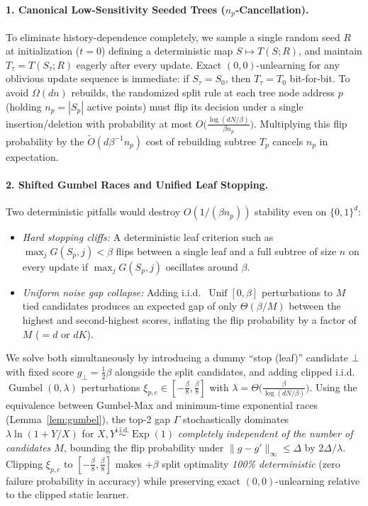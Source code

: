 \documentclass[11pt]{article}
\theoremstyle{definition}
\newcommand{\Unif}{\operatorname{Unif}}
\newcommand{\Gumbel}{\operatorname{Gumbel}}
\newcommand{\Expo}{\operatorname{Exp}}
\begin{document}
\paragraph{1. Canonical Low-Sensitivity Seeded Trees ($n_p$-Cancellation).}
To eliminate history-dependence completely, we sample a single random seed $R$ at initialization ($t = 0$) defining a deterministic map $S \mapsto T(S; R)$, and maintain $T_\tau = T(S_\tau; R)$ eagerly after every update. Exact $(0,0)$-unlearning for any oblivious update sequence is immediate: if $S_\tau = S_0$, then $T_\tau = T_0$ bit-for-bit. To avoid $\Omega(dn)$ rebuilds, the randomized split rule at each tree node address $p$ (holding $n_p = |S_p|$ active points) must flip its decision under a single insertion/deletion with probability at most $O\big(\frac{\log(dN/\beta)}{\beta n_p}\big)$. Multiplying this flip probability by the $\tilde{O}(d\beta^{-1} n_p)$ cost of rebuilding subtree $T_p$ cancels $n_p$ in expectation.

\paragraph{2. Shifted Gumbel Races and Unified Leaf Stopping.}
Two deterministic pitfalls would destroy $O(1/(\beta n_p))$ stability even on $\{0,1\}^d$:
\begin{itemize}[leftmargin=1.5em]
    \item \emph{Hard stopping cliffs:} A deterministic leaf criterion such as $\max_j G(S_p, j) < \beta$ flips between a single leaf and a full subtree of size $n$ on every update if $\max_j G(S_p, j)$ oscillates around $\beta$.
    \item \emph{Uniform noise gap collapse:} Adding i.i.d.\ $\Unif[0, \beta]$ perturbations to $M$ tied candidates produces an expected gap of only $\Theta(\beta / M)$ between the highest and second-highest scores, inflating the flip probability by a factor of $M$ ($= d$ or $dK$).
\end{itemize}
We solve both simultaneously by introducing a dummy ``stop (leaf)'' candidate $\bot$ with fixed score $g_\bot = \frac{1}{2}\beta$ alongside the split candidates, and adding clipped i.i.d.\ $\Gumbel(0, \lambda)$ perturbations $\xi_{p, c} \in [-\frac{\beta}{8}, \frac{\beta}{8}]$ with $\lambda = \Theta\big(\frac{\beta}{\log(dN/\beta)}\big)$. Using the equivalence between Gumbel-Max and minimum-time exponential races (Lemma~\ref{lem:gumbel}), the top-2 gap $\Gamma$ stochastically dominates $\lambda \ln(1 + Y/X)$ for $X, Y \stackrel{\text{i.i.d.}}{\sim} \Expo(1)$ \emph{completely independent of the number of candidates $M$}, bounding the flip probability under $\|g - g'\|_\infty \le \Delta$ by $2\Delta / \lambda$. Clipping $\xi_{p, c}$ to $[-\frac{\beta}{8}, \frac{\beta}{8}]$ makes $+\beta$ split optimality \emph{100\% deterministic} (zero failure probability in accuracy) while preserving exact $(0,0)$-unlearning relative to the clipped static learner.
\end{document}
